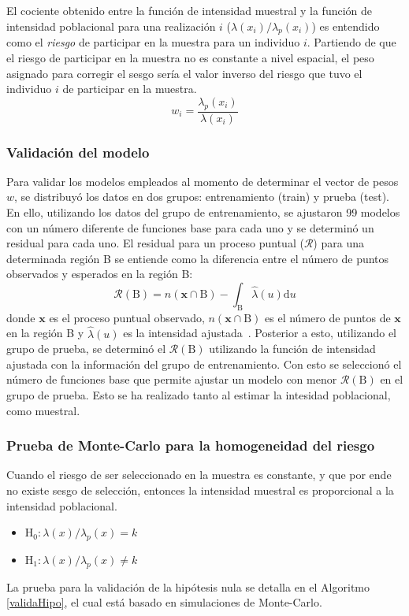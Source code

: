 El cociente obtenido entre la función de intensidad muestral y la función de intensidad poblacional para una realización $i$ ($\lambda(x_i)/\lambda_p(x_i)$) es entendido como el \textit{riesgo} de participar en la muestra para un individuo $i$. Partiendo de que el riesgo de participar en la muestra no es constante a nivel espacial, el peso asignado para corregir el sesgo sería el valor inverso del riesgo que tuvo el individuo $i$ de participar en la muestra.
\begin{equation}
	w_i = \frac{\lambda_p(x_i)}{\lambda(x_i)}
\end{equation}

\subsubsection{Validación del modelo}
Para validar los modelos empleados al momento de determinar el vector de pesos $w$, se distribuyó los datos en dos grupos: entrenamiento (train) y prueba (test).
En ello, utilizando los datos del grupo de entrenamiento, se ajustaron 99 modelos con un número diferente de funciones base para cada uno y se determinó un residual para cada uno. El residual para un proceso puntual ($\mathscr{R}$) para una determinada región B se entiende como la diferencia entre el número de puntos observados y esperados en  la región B:
\begin{equation}
	\mathscr{R}(\mathrm{B}) = n(\textbf{x} \cap \mathrm{B}) - \int_{\mathrm{B}} \hat{\lambda} (u) \mathrm{d} u
\end{equation}
donde $\textbf{x}$ es el proceso puntual observado, $n(\textbf{x} \cap \mathrm{B})$ es el número de puntos de $\textbf{x}$ en la región B y $\hat{\lambda} (u)$ es la intensidad ajustada~\cite{baddeley2015spatial}.
Posterior a esto, utilizando el grupo de prueba, se determinó el $\mathscr{R}(\mathrm{B})$ utilizando la función de intensidad ajustada con la información del grupo de entrenamiento. Con esto se seleccionó el número de funciones base que permite ajustar un modelo con menor $\mathscr{R}(\mathrm{B})$ en el grupo de prueba. Esto se ha realizado tanto al estimar la intesidad poblacional, como muestral.

\subsubsection{Prueba de Monte-Carlo para la homogeneidad del riesgo}
Cuando el riesgo de ser seleccionado en la muestra es constante, y que por ende no existe sesgo de selección, entonces la intensidad muestral es proporcional a la intensidad poblacional. 
\begin{itemize}
	\item $\mathrm{H}_0: \lambda(x) / \lambda_p(x) = k $
	\item $\mathrm{H}_1: \lambda(x) / \lambda_p(x) \neq k $
\end{itemize}
La prueba para la validación de la hipótesis nula se detalla en el Algoritmo \ref{validaHipo}, el cual está basado en simulaciones de Monte-Carlo.

